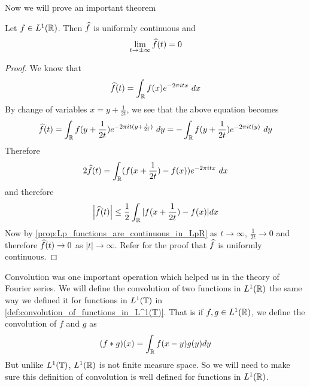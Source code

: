  
  Now we will prove an important theorem
  \begin{theorem}
    Let $f \in L^1(\mathbb R)$. Then $\widehat{f}$ is uniformly continuous and $$\lim_{t \to \pm \infty} \widehat{f}(t) = 0$$
  \end{theorem}
  \begin{proof}
    We know that $$\widehat{f}(t) = \int_\mathbb R f(x)e^{-2 \pi itx} \ dx $$
    By change of variables $x = y + \frac{1}{2t}$, we see that the above equation becomes $$\widehat{f}(t) = \int_\mathbb R f(y + \frac{1}{2t})e^{-2 \pi it(y+ \frac{1}{2t})} \ dy = -\int_\mathbb R f(y + \frac{1}{2t})e^{-2 \pi it(y)} \ dy  $$
    Therefore $$2\widehat{f}(t) = \int_\mathbb R (f(x + \frac{1}{2t}) - f(x))e^{-2 \pi itx} \ dx $$
    and therefore $$\left|\widehat{f}(t)\right| \le \frac{1}{2} \int_\mathbb R |f(x + \frac{1}{2t}) - f(x)| dx$$
    Now by \autoref{prop:Lp_functions_are_continuous_in_LpR} as $t \to \infty$, $\frac{1}{2t} \to 0$ and therefore $\widehat{f}(t) \to 0$ as $|t| \to \infty$. Refer \autocite[Theorem~10.4 \pno~251]{MontgomeryFourier} for the proof that $\widehat{f}$ is uniformly continuous.
  \end{proof}

  Convolution was one important operation which helped us in the theory of Fourier series. We will define the convolution of two functions in $L^1(\mathbb R)$ the same way we defined it for functions in $L^1(\mathbb T)$ in \autoref{def:convolution_of_functions_in_L^1(T)}. That is if $f, g \in L^1(\mathbb R)$, we define the convolution of $f$ and $g$ as $$(f*g)(x) = \int_{\mathbb R} f(x-y)g(y) dy$$
  But unlike $L^1(\mathbb T)$, $L^1(\mathbb R)$ is not finite measure space. So we will need to make sure this definition of convolution is well defined for functions in $L^1(\mathbb R)$. 

